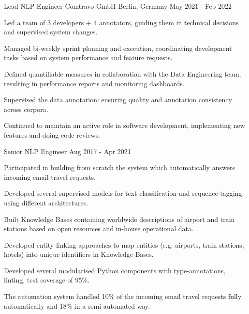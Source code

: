 \begin{cventries}

\cventry
    {Lead NLP Engineer} 
    {Comtravo GmbH} 
    {Berlin, Germany} 
    {May 2021 - Feb 2022}
    {
      \begin{cvitems} 
		  \item {Led a team of 3 developers + 4 annotators, guiding them in technical decisions and supervised system changes.}
		  \item {Managed bi-weekly sprint planning and execution, coordinating development tasks based on system performance and feature requests.}
		  \item {Defined quantifiable measures in collaboration with the Data Engineering team, resulting in performance reports and monitoring dashboards.}
		  \item {Supervised the data annotation: ensuring quality and annotation consistency across corpora.}
		  \item {Continued to maintain an active role in software development, implementing new features and doing code reviews.}
        \end{cvitems}
 	}


  \cventry
    {Senior NLP Engineer}
    {} %
    {} %
    {Aug 2017 - Apr 2021} %
    {
      \begin{cvitems}
		\item {Participated in building from scratch the system which automatically answers incoming email travel requests.}
		\item {Developed several supervised models for text classification and sequence tagging using different architectures.}
		\item {Built Knowledge Bases containing worldwide descriptions of airport and train stations based on open resources and in-house operational data.}
		\item {Developed entity-linking approaches to map entities (e.g: airports, train stations, hotels) into unique identifiers in Knowledge Bases.}
		\item {Developed several modularised Python components with type-annotations, linting, test coverage of 95\%.}
		\item {The automation system handled 10\% of the incoming email travel requests fully automatically and 18\% in a semi-automated way.}
        \end{cvitems}
 	}




\end{cventries}
